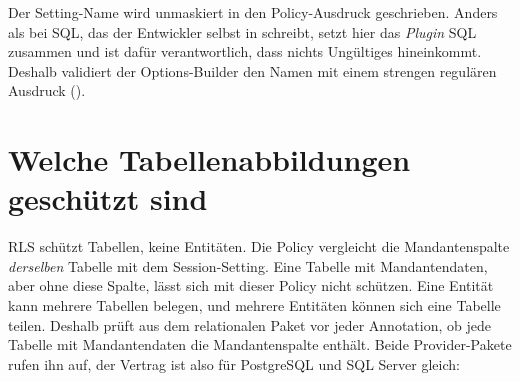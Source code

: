 \begin{important}
  Der Setting-Name wird unmaskiert in den Policy-Ausdruck geschrieben. Anders als bei SQL,
  das der Entwickler selbst in
   schreibt, setzt hier
  das \emph{Plugin} SQL zusammen und ist dafür verantwortlich, dass nichts Ungültiges
  hineinkommt. Deshalb validiert der Options-Builder den Namen mit einem strengen regulären
  Ausdruck
  ().
\end{important}

\section{Welche Tabellenabbildungen geschützt sind}\label{sec:supported-table-mappings}

RLS schützt Tabellen, keine Entitäten. Die Policy vergleicht die Mandantenspalte \emph{derselben}
Tabelle mit dem Session-Setting. Eine Tabelle mit Mandantendaten, aber ohne diese Spalte, lässt
sich mit dieser Policy nicht schützen. Eine Entität kann mehrere Tabellen belegen, und mehrere
Entitäten können sich eine Tabelle teilen. Deshalb prüft
 aus dem relationalen Paket
vor jeder Annotation, ob jede Tabelle mit Mandantendaten die Mandantenspalte enthält. Beide
Provider-Pakete rufen ihn auf, der Vertrag ist also für PostgreSQL und SQL Server gleich:

